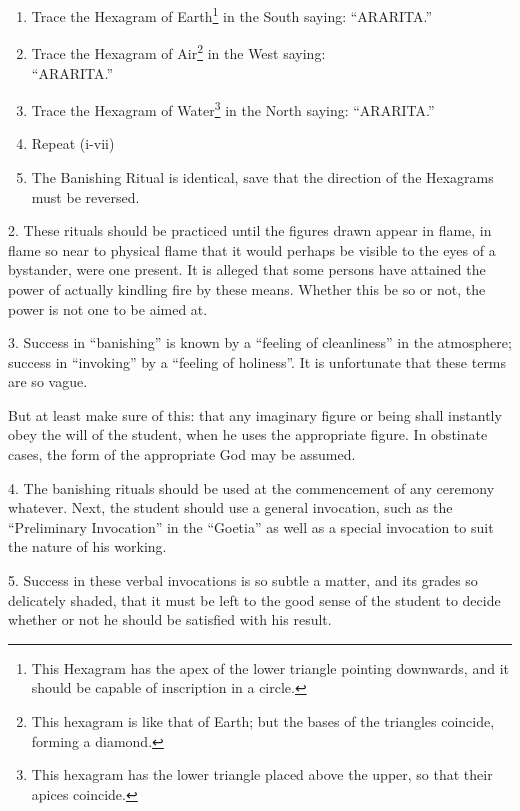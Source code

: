 \begin{Facing}
\begin{enumerate}[label=(\textit{\Roman*})]
\item Trace the Hexagram of Earth\footnote{This Hexagram has the apex of the lower triangle pointing downwards, and it should be capable of inscription in a circle.} in the South saying: \enquote{ARARITA.}
\item Trace the Hexagram of Air\footnote{This hexagram is like that of Earth; but the bases of the triangles coincide, forming a diamond.} in the West saying: \\ \enquote{ARARITA.}
\item Trace the Hexagram of Water\footnote{This hexagram has the lower triangle placed above the upper, so that their apices coincide.} in the North saying: \enquote{ARARITA.}
\item Repeat (i-vii)
\item[] The Banishing Ritual is identical, save that the direction of the Hexagrams must be reversed.
\end{enumerate}
\end{Facing}


2. These rituals should be practiced until the figures drawn appear in flame, in flame so near to physical flame that it would perhaps be visible to the eyes of a bystander, were one present. It is alleged that some persons have attained the power of actually kindling fire by these means. Whether this be so or not, the power is not one to be aimed at.

3. Success in \enquote{banishing} is known by a \enquote{feeling of cleanliness} in the atmosphere; success in \enquote{invoking} by a \enquote{feeling of holiness}. It is unfortunate that these terms are so vague.

But at least make sure of this: that any imaginary figure or being shall instantly obey the will of the student, when he uses the appropriate figure. In obstinate cases, the form of the appropriate God may be assumed.

4. The banishing rituals should be used at the commencement of any ceremony whatever. Next, the student should use a general invocation, such as the \enquote{Preliminary Invocation} in the \enquote{Goetia} as well as a special invocation to suit the nature of his working.

5. Success in these verbal invocations is so subtle a matter, and its grades so delicately shaded, that it must be left to the good sense of the student to decide whether or not he should be satisfied with his result.

